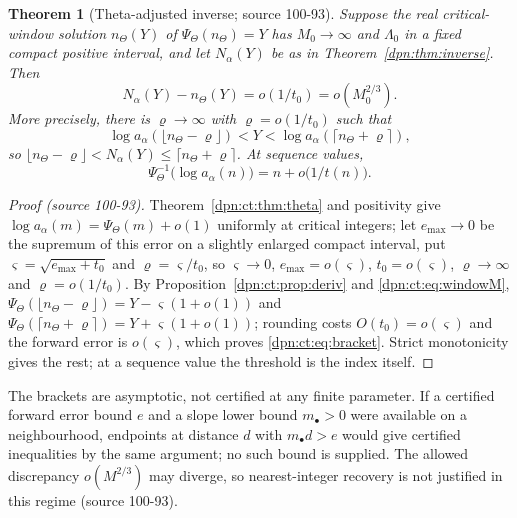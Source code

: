 \documentclass[11pt]{article}
\numberwithin{equation}{section}
\newtheorem{theorem}{Theorem}[section]
\theoremstyle{definition}\newtheorem{definition}[theorem]{Definition}
\theoremstyle{remark}\newtheorem{remark}[theorem]{Remark}
\newcommand{\src}[1]{\textup{(source #1)}}
\begin{document}
\begin{theorem}[Theta-adjusted inverse; source 100-93]\label{dpn:ct:thm:inverse}
Suppose the real critical-window solution $n_\Theta(Y)$ of
$\Psi_\Theta(n_\Theta)=Y$ has $M_0\to\infty$ and $\Lambda_0$ in a fixed compact
positive interval, and let $N_\alpha(Y)$ be as in Theorem~\ref{dpn:thm:inverse}.
Then
\begin{equation}\label{dpn:ct:eq:inverseerror}
 N_\alpha(Y)-n_\Theta(Y)=o(1/t_0)=o(M_0^{2/3}).
\end{equation}
More precisely, there is $\varrho\to\infty$ with $\varrho=o(1/t_0)$ such that
\begin{equation}\label{dpn:ct:eq:bracket}
 \log a_\alpha(\lfloor n_\Theta-\varrho\rfloor)<Y<\log a_\alpha(\lceil n_\Theta+\varrho\rceil),
\end{equation}
so $\lfloor n_\Theta-\varrho\rfloor<N_\alpha(Y)\le\lceil n_\Theta+\varrho\rceil$.  At
sequence values,
\begin{equation}\label{dpn:ct:eq:exactrange}
 \Psi_\Theta^{-1}\bigl(\log a_\alpha(n)\bigr)=n+o\bigl(1/t(n)\bigr).
\end{equation}
\end{theorem}
\begin{proof}[Proof \src{100-93}]
Theorem~\ref{dpn:ct:thm:theta} and positivity give
$\log a_\alpha(m)=\Psi_\Theta(m)+o(1)$ uniformly at critical integers; let
$e_{\max}\to0$ be the supremum of this error on a slightly enlarged compact
interval, put $\varsigma=\sqrt{e_{\max}+t_0}$ and $\varrho=\varsigma/t_0$, so
$\varsigma\to0$, $e_{\max}=o(\varsigma)$, $t_0=o(\varsigma)$, $\varrho\to\infty$ and
$\varrho=o(1/t_0)$.  By Proposition~\ref{dpn:ct:prop:deriv} and
\eqref{dpn:ct:eq:windowM},
$\Psi_\Theta(\lfloor n_\Theta-\varrho\rfloor)=Y-\varsigma(1+o(1))$ and
$\Psi_\Theta(\lceil n_\Theta+\varrho\rceil)=Y+\varsigma(1+o(1))$; rounding costs
$O(t_0)=o(\varsigma)$ and the forward error is $o(\varsigma)$, which proves
\eqref{dpn:ct:eq:bracket}.  Strict monotonicity gives the rest; at a sequence
value the threshold is the index itself.
\end{proof}
The brackets are asymptotic, not certified at any finite parameter.  If a
certified forward error bound $e$ and a slope lower bound $m_\bullet>0$ were
available on a neighbourhood, endpoints at distance $d$ with $m_\bullet d>e$
would give certified inequalities by the same argument; no such bound is
supplied.  The allowed discrepancy $o(M^{2/3})$ may diverge, so
nearest-integer recovery is not justified in this regime \src{100-93}.
\end{document}
